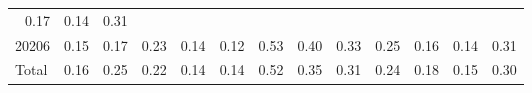 \begin{table}[!h]
\begin{tabular}{lllllllllllll}
  \multicolumn{1}{r}{0.17} &
  \multicolumn{1}{r}{0.14} &
  \multicolumn{1}{r}{0.31} \\
\multicolumn{1}{l}{\hspace{1em}20206} &
  \multicolumn{1}{|r}{0.15} &
  \multicolumn{1}{r}{0.17} &
  \multicolumn{1}{r}{0.23} &
  \multicolumn{1}{r}{0.14} &
  \multicolumn{1}{r}{0.12} &
  \multicolumn{1}{r}{0.53} &
  \multicolumn{1}{r}{0.40} &
  \multicolumn{1}{r}{0.33} &
  \multicolumn{1}{r}{0.25} &
  \multicolumn{1}{r}{0.16} &
  \multicolumn{1}{r}{0.14} &
  \multicolumn{1}{r}{0.31} \\
\multicolumn{1}{l}{\hspace{1em}Total} &
  \multicolumn{1}{|r}{0.16} &
  \multicolumn{1}{r}{0.25} &
  \multicolumn{1}{r}{0.22} &
  \multicolumn{1}{r}{0.14} &
  \multicolumn{1}{r}{0.14} &
  \multicolumn{1}{r}{0.52} &
  \multicolumn{1}{r}{0.35} &
  \multicolumn{1}{r}{0.31} &
  \multicolumn{1}{r}{0.24} &
  \multicolumn{1}{r}{0.18} &
  \multicolumn{1}{r}{0.15} &
  \multicolumn{1}{r}{0.30} \\
\cline{1-13}
\end{tabular}
\end{table}
